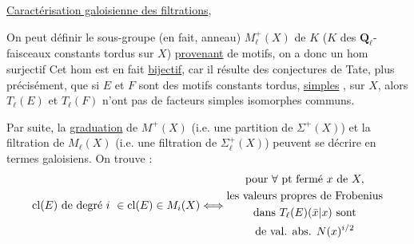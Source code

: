 \uline{Caractérisation galoisienne des filtrations},

On peut définir le sous-groupe (en fait, anneau) $M_\ell^+(X)$ de $K$ ($K$ des  $\mathbf{Q}_\ell$-faisceaux constants tordus sur $X$) \uline{provenant} de motifs, on a donc un hom surjectif
 Cet hom est en fait \uline{bijectif}, car il résulte des conjectures de Tate, plus précisément, que si $E$ et $F$ sont des motifs constants tordus, \uline{simples} , sur $X$, alors $T_\ell(E)$ et $T_\ell(F)$  n'ont pas de facteurs simples isomorphes communs.

Par suite,  la  \uline{graduation} de $M^+(X)$ (i.e. une partition de $\Sigma^+(X)$) et la filtration de $M_\ell(X)$ (i.e. une filtration de $\Sigma_\ell^+(X)$) peuvent se décrire en termes galoisiens. On trouve  :
\[
\deleted{\mathrm{cl}(E)\text{ de degré }i\ \in}\inserted{\mathrm{cl}(E)\in}M_i(X)
\Longleftrightarrow
\begin{gathered}
\text{pour }\forall\text{ pt fermé }x\text{ de }X,\\
\text{les valeurs propres de Frobenius}\\
\text{dans }T_\ell(E)(\unsure{\bar{x}|x})\text{ sont}\\
\text{de val. abs. }N(x)^{i/2}
\end{gathered}
\]
